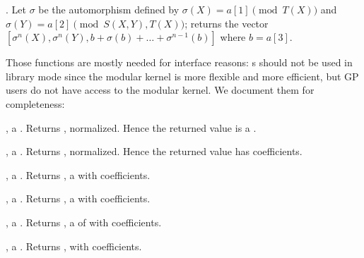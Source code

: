 . Let
$\sigma$ be the automorphism defined by $\sigma(X)=a[1]\pmod{T(X)}$ and
$\sigma(Y)=a[2]\pmod{S(X,Y),T(X)}$; returns the vector
$[\sigma^n(X),\sigma^n(Y),b+\sigma(b)+\ldots+\sigma^{n-1}(b)]$
where $b=a[3]$.



Those functions are mostly needed for interface reasons: s should
not be used in library mode since the modular kernel is more flexible and more
efficient, but GP users do not have access to the modular kernel.
We document them for completeness:

,  a . Returns , normalized. Hence the returned value is a .

,  a . Returns , normalized. Hence the returned value has  coefficients.

,  a . Returns , a  with  coefficients.

,  a . Returns , a  with  coefficients.

,  a . Returns , a  of  with  coefficients.

,  a . Returns , with  coefficients.











